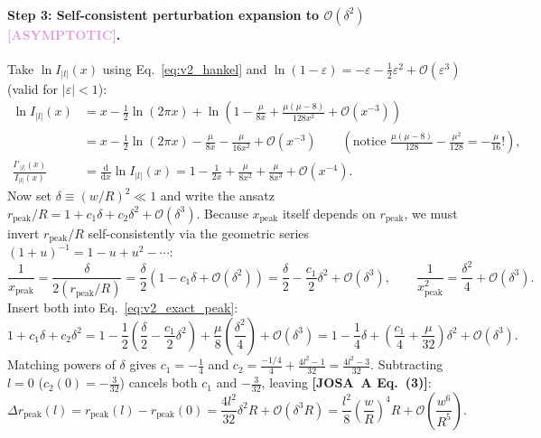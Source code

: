 \documentclass[10pt,letterpaper]{article}
\newcommand{\abs}[1]{\lvert #1 \rvert}
\newcommand{\dd}{\mathrm{d}}
\newcommand{\josa}[1]{\textbf{[JOSA~A Eq.~(#1)]}}
\newcommand{\tagasymp}{\textcolor{plum}{\textbf{[ASYMPTOTIC]}}}
\numberwithin{equation}{section}
\begin{document}
\paragraph*{Step 3: Self-consistent perturbation expansion to $\mathcal{O}(\delta^2)$ \tagasymp{}.}
Take $\ln I_{\abs{l}}(x)$ using Eq.~\eqref{eq:v2_hankel} and $\ln(1 - \varepsilon) = -\varepsilon - \frac{1}{2}\varepsilon^2 + \mathcal{O}(\varepsilon^3)$ (valid for $\abs{\varepsilon} < 1$):
\begin{align}
  \ln I_{\abs{l}}(x) &= x - \frac{1}{2}\ln(2\pi x) + \ln\!\left(1 - \frac{\mu}{8x} + \frac{\mu(\mu-8)}{128 x^2} + \mathcal{O}(x^{-3})\right) \nonumber \\
  &= x - \frac{1}{2}\ln(2\pi x) - \frac{\mu}{8x} - \frac{\mu}{16 x^2} + \mathcal{O}(x^{-3}) \qquad\left(\text{notice }\frac{\mu(\mu-8)}{128} - \frac{\mu^2}{128} = -\frac{\mu}{16}!\right), \\
  \frac{I'_{\abs{l}}(x)}{I_{\abs{l}}(x)} &= \frac{\dd}{\dd x}\ln I_{\abs{l}}(x) = 1 - \frac{1}{2x} + \frac{\mu}{8x^2} + \frac{\mu}{8x^3} + \mathcal{O}(x^{-4}).
\end{align}
Now set $\delta \equiv (w/R)^2 \ll 1$ and write the ansatz $r_{\mathrm{peak}}/R = 1 + c_1\delta + c_2\delta^2 + \mathcal{O}(\delta^3)$. Because $x_{\mathrm{peak}}$ itself depends on $r_{\mathrm{peak}}$, we must invert $r_{\mathrm{peak}}/R$ self-consistently via the geometric series $(1+u)^{-1} = 1 - u + u^2 - \cdots$:
\begin{equation}
  \frac{1}{x_{\mathrm{peak}}} = \frac{\delta}{2(r_{\mathrm{peak}}/R)} = \frac{\delta}{2}\left(1 - c_1\delta + \mathcal{O}(\delta^2)\right) = \frac{\delta}{2} - \frac{c_1}{2}\delta^2 + \mathcal{O}(\delta^3), \qquad \frac{1}{x_{\mathrm{peak}}^2} = \frac{\delta^2}{4} + \mathcal{O}(\delta^3).
\end{equation}
Insert both into Eq.~\eqref{eq:v2_exact_peak}:
\begin{equation}
  1 + c_1\delta + c_2\delta^2 = 1 - \frac{1}{2}\left(\frac{\delta}{2} - \frac{c_1}{2}\delta^2\right) + \frac{\mu}{8}\left(\frac{\delta^2}{4}\right) + \mathcal{O}(\delta^3) = 1 - \frac{1}{4}\delta + \left(\frac{c_1}{4} + \frac{\mu}{32}\right)\delta^2 + \mathcal{O}(\delta^3).
\end{equation}
Matching powers of $\delta$ gives $c_1 = -\frac{1}{4}$ and $c_2 = \frac{-1/4}{4} + \frac{4l^2-1}{32} = \frac{4l^2 - 3}{32}$. Subtracting $l = 0$ ($c_2(0) = -\frac{3}{32}$) cancels both $c_1$ and $-\frac{3}{32}$, leaving \josa{3}:
\begin{equation}
  \Delta r_{\mathrm{peak}}(l) = r_{\mathrm{peak}}(l) - r_{\mathrm{peak}}(0) = \frac{4l^2}{32}\delta^2 R + \mathcal{O}(\delta^3 R) = \frac{l^2}{8}\left(\frac{w}{R}\right)^4 R + \mathcal{O}\!\left(\frac{w^6}{R^5}\right).
\end{equation}
\end{document}
